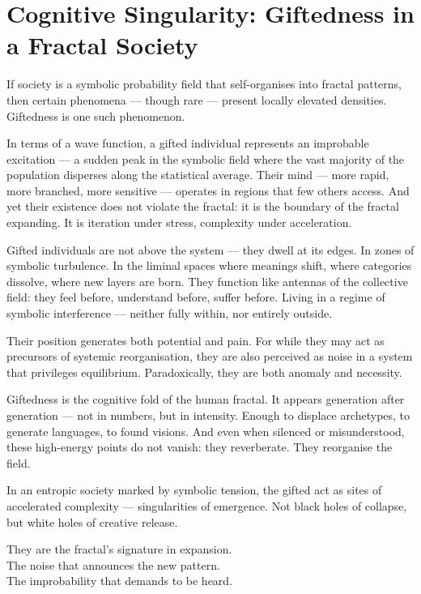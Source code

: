 \section{Cognitive Singularity: Giftedness in a Fractal Society}

If society is a symbolic probability field that self-organises into fractal patterns, then certain phenomena — though rare — present locally elevated densities. Giftedness is one such phenomenon.

In terms of a wave function, a gifted individual represents an improbable excitation — a sudden peak in the symbolic field where the vast majority of the population disperses along the statistical average. Their mind — more rapid, more branched, more sensitive — operates in regions that few others access. And yet their existence does not violate the fractal: it is the boundary of the fractal expanding. It is iteration under stress, complexity under acceleration.

Gifted individuals are not above the system — they dwell at its edges. In zones of symbolic turbulence. In the liminal spaces where meanings shift, where categories dissolve, where new layers are born. They function like antennas of the collective field: they feel before, understand before, suffer before. Living in a regime of symbolic interference — neither fully within, nor entirely outside.

Their position generates both potential and pain. For while they may act as precursors of systemic reorganisation, they are also perceived as noise in a system that privileges equilibrium. Paradoxically, they are both anomaly and necessity.

Giftedness is the cognitive fold of the human fractal. It appears generation after generation — not in numbers, but in intensity. Enough to displace archetypes, to generate languages, to found visions. And even when silenced or misunderstood, these high-energy points do not vanish: they reverberate. They reorganise the field.

In an entropic society marked by symbolic tension, the gifted act as sites of accelerated complexity — singularities of emergence. Not black holes of collapse, but white holes of creative release.

They are the fractal’s signature in expansion.\\
The noise that announces the new pattern.\\
The improbability that demands to be heard.